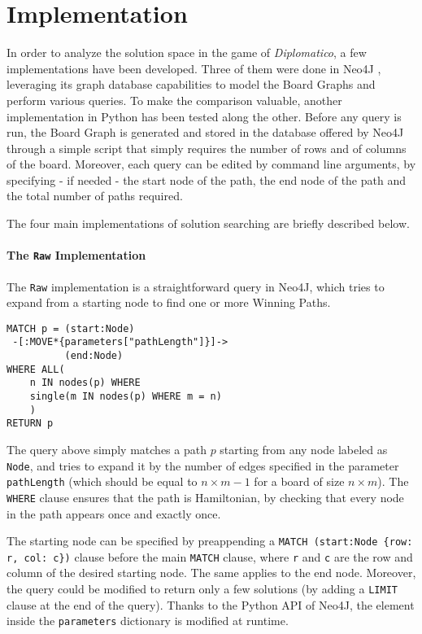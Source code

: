 \documentclass[conference]{IEEEtran}
\begin{document}
\section{Implementation}
In order to analyze the solution space in the game of \textit{Diplomatico}, a few implementations have been developed.
Three of them were done in Neo4J \cite{neo4j}, leveraging its graph database capabilities to model the Board Graphs and perform various queries. To make the comparison valuable, another implementation in Python has been tested along the other.
Before any query is run, the Board Graph is generated and stored in the database offered by Neo4J through a simple script that simply requires the number of rows and of columns of the board.
Moreover, each query can be edited by command line arguments, by specifying - if needed - the start node of the path, the end node of the path and the total number of paths required.

The four main implementations of solution searching are briefly described below.

\paragraph{The \texttt{Raw} Implementation}
The \texttt{Raw} implementation is a straightforward query in Neo4J, which tries to expand from a starting node to find one or more Winning Paths.

\begin{tcolorbox}[colback=yellow!5!white, colframe=yellow!50!black]
\begin{verbatim}
MATCH p = (start:Node)
 -[:MOVE*{parameters["pathLength"]}]->
          (end:Node)
WHERE ALL(
    n IN nodes(p) WHERE 
    single(m IN nodes(p) WHERE m = n)
    )
RETURN p
\end{verbatim}
\end{tcolorbox}

The query above simply matches a path $p$ starting from any node labeled as \texttt{Node}, and tries to expand it by the number of edges specified in the parameter \texttt{pathLength} (which should be equal to $n \times m - 1$ for a board of size $n \times m$).
The \texttt{WHERE} clause ensures that the path is Hamiltonian, by checking that every node in the path appears once and exactly once.

The starting node can be specified by preappending a \texttt{MATCH (start:Node \{row: r, col: c\})} clause before the main \texttt{MATCH} clause, where \texttt{r} and \texttt{c} are the row and column of the desired starting node. The same applies to the end node.
Moreover, the query could be modified to return only a few solutions (by adding a \texttt{LIMIT} clause at the end of the query).
Thanks to the Python API of Neo4J, the element inside the \texttt{parameters} dictionary is modified at runtime.
\end{document}
